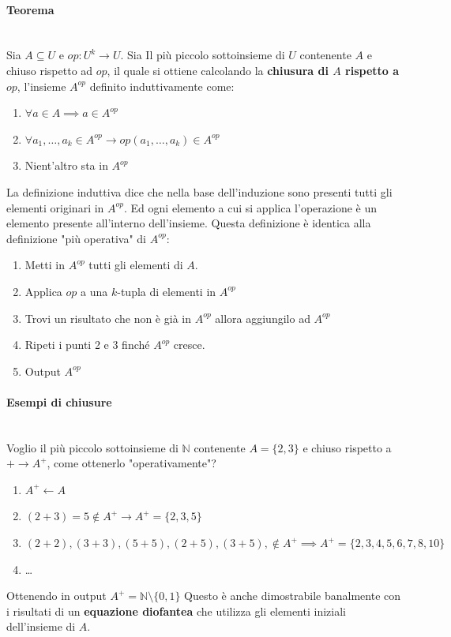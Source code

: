 \documentclass{article}
\begin{document}
\paragraph{Teorema}\mbox{}\\
Sia $A\subseteq U$ e $op:U^k\rightarrow U$. Sia Il più piccolo sottoinsieme di $U$
contenente $A$ e chiuso rispetto ad $op$, il quale si ottiene calcolando la \textbf{chiusura di $A$
    rispetto a $op$}, l'insieme $A^{op}$ definito induttivamente come:
\begin{enumerate}
    \item $\forall a\in A\implies a\in A^{op}$
    \item $\forall a_1,\dots,a_k\in A^{op}\rightarrow op(a_1,\dots,a_k)\in A^{op}$
    \item Nient'altro sta in $A^{op}$
\end{enumerate}
La definizione induttiva dice che nella base dell'induzione sono presenti tutti gli elementi
originari in $A^{op}$. Ed ogni elemento a cui si applica l'operazione è un elemento
presente all'interno dell'insieme. Questa definizione è identica alla definizione "più
operativa" di $A^{op}$:
\begin{enumerate}
    \item Metti in $A^{op}$ tutti gli elementi di $A$.
    \item Applica $op$ a una $k$-tupla di elementi in $A^{op}$
    \item Trovi un risultato che non è già in $A^{op}$ allora
          aggiungilo ad $A^{op}$
    \item Ripeti i punti 2 e 3 finché $A^{op}$ cresce.
    \item Output $A^{op}$
\end{enumerate}

\paragraph{Esempi di chiusure}\mbox{}\\
Voglio il più piccolo sottoinsieme di $\mathbb{N}$ contenente $A=\{2,3\}$ e chiuso rispetto
a $+\rightarrow A^+$, come ottenerlo "operativamente"?
\begin{enumerate}
    \item $A^+\leftarrow A$
    \item $(2+3)=5 \notin A^+ \rightarrow A^+ =\{2,3,5\}$
    \item $(2+2),(3+3),(5+5),(2+5),(3+5), \notin A^+\implies A^+=\{2,3,4,5,6,7,8,10\}$
    \item \dots
\end{enumerate}
Ottenendo in output $A^+=\mathbb{N}\setminus\{0,1\}$
Questo è anche dimostrabile banalmente con i risultati di un \textbf{equazione diofantea}
che utilizza gli elementi iniziali dell'insieme di $A$.
\end{document}

